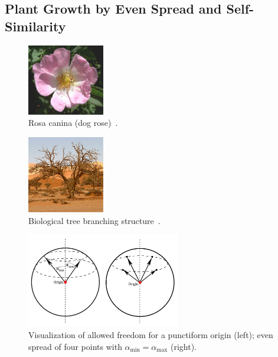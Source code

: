 \documentclass[11pt, abstract=on]{scrartcl}
\begin{document}
\subsection{Plant Growth by Even Spread and Self-Similarity} \label{cpt:EvenSelfSim}

\begin{figure} 
 	\centering
 		\includegraphics[width=0.3\textwidth]{Pic_DogRose.png}
 	\caption{Rosa canina (dog rose)~\cite{WikipediaDogRose}.}
 	\label{fig:DogRose}
\end{figure}

\begin{figure} 
 	\centering
 		\includegraphics[width=0.3\textwidth]{Pic_Tree.png}
 	\caption{Biological tree branching structure~\cite{WikipediaTree}.}
 	\label{fig:IRLTree}
\end{figure}

\begin{figure} 
 	\centering
 		\includegraphics[width=0.6\textwidth]{Fig_SphereInOne.png}
 	\caption{Visualization of allowed freedom for a punctiform origin (left); even spread of four points with $\alpha_\text{min} = \alpha_\text{max}$ (right).}
 	\label{fig:FreedomSpheres}
\end{figure}
\end{document}
